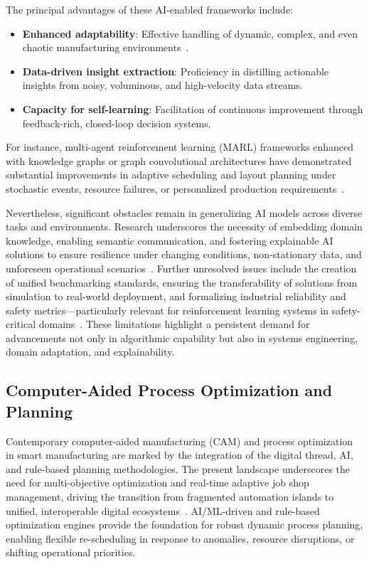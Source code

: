 The principal advantages of these AI-enabled frameworks include:

\begin{itemize}
    \item \textbf{Enhanced adaptability}: Effective handling of dynamic, complex, and even chaotic manufacturing environments~\cite{ref13,ref19}.
    \item \textbf{Data-driven insight extraction}: Proficiency in distilling actionable insights from noisy, voluminous, and high-velocity data streams.
    \item \textbf{Capacity for self-learning}: Facilitation of continuous improvement through feedback-rich, closed-loop decision systems.
\end{itemize}

For instance, multi-agent reinforcement learning (MARL) frameworks enhanced with knowledge graphs or graph convolutional architectures have demonstrated substantial improvements in adaptive scheduling and layout planning under stochastic events, resource failures, or personalized production requirements~\cite{ref27,ref37}.

Nevertheless, significant obstacles remain in generalizing AI models across diverse tasks and environments. Research underscores the necessity of embedding domain knowledge, enabling semantic communication, and fostering explainable AI solutions to ensure resilience under changing conditions, non-stationary data, and unforeseen operational scenarios~\cite{ref37,ref41}. Further unresolved issues include the creation of unified benchmarking standards, ensuring the transferability of solutions from simulation to real-world deployment, and formalizing industrial reliability and safety metrics—particularly relevant for reinforcement learning systems in safety-critical domains~\cite{ref38}. These limitations highlight a persistent demand for advancements not only in algorithmic capability but also in systems engineering, domain adaptation, and explainability.

\subsection{Computer-Aided Process Optimization and Planning}

Contemporary computer-aided manufacturing (CAM) and process optimization in smart manufacturing are marked by the integration of the digital thread, AI, and rule-based planning methodologies. The present landscape underscores the need for multi-objective optimization and real-time adaptive job shop management, driving the transition from fragmented automation islands to unified, interoperable digital ecosystems~\cite{ref4,ref11,ref16,ref18,ref19,ref20,ref27,ref28,ref29,ref30,ref38,ref44,ref45,ref49,ref51,ref55,ref59,ref60,ref61,ref70}. AI/ML-driven and rule-based optimization engines provide the foundation for robust dynamic process planning, enabling flexible re-scheduling in response to anomalies, resource disruptions, or shifting operational priorities.

